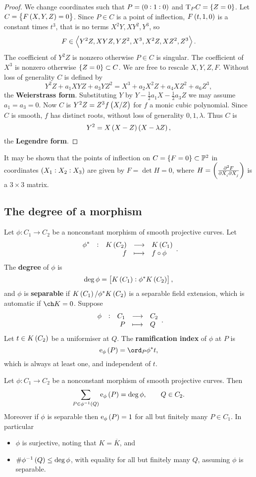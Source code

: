\begin{proof}
We change coordinates such that $ P = \br{0 : 1 : 0} $ and $ \T_PC = \cbr{Z = 0} $. Let $ C = \cbr{F\br{X, Y, Z} = 0} $. Since $ P \in C $ is a point of inflection, $ F\br{t, 1, 0} $ is a constant times $ t^3 $, that is no terms $ X^2Y, XY^2, Y^3 $, so
$$ F \in \left\langle Y^2Z, XYZ, YZ^2, X^3, X^2Z, XZ^2, Z^3 \right\rangle. $$
The coefficient of $ Y^2Z $ is nonzero otherwise $ P \in C $ is singular. The coefficient of $ X^3 $ is nonzero otherwise $ \cbr{Z = 0} \subset C $. We are free to rescale $ X, Y, Z, F $. Without loss of generality $ C $ is defined by
$$ Y^2Z + a_1XYZ + a_3YZ^2 = X^3 + a_2X^2Z + a_4XZ^2 + a_6Z^3, $$
the \textbf{Weierstrass form}. Substituting $ Y $ by $ Y - \tfrac{1}{2}a_1X - \tfrac{1}{2}a_3Z $ we may assume $ a_1 = a_3 = 0 $. Now $ C $ is $ Y^2Z = Z^3f\br{X / Z} $ for $ f $ a monic cubic polynomial. Since $ C $ is smooth, $ f $ has distinct roots, without loss of generality $ 0, 1, \lambda $. Thus $ C $ is
$$ Y^2 = X\br{X - Z}\br{X - \lambda Z}, $$
the \textbf{Legendre form}.
\end{proof}

\begin{remark*}
It may be shown that the points of inflection on $ C = \cbr{F = 0} \subset \PP^2 $ in coordinates $ \br{X_1 : X_2 : X_3} $ are given by $ F = \det H = 0 $, where $ H = \br{\tmd{F}{2}{X_i}{}{X_j}{}} $ is a $ 3 \times 3 $ matrix.
\end{remark*}

\subsection{The degree of a morphism}

\begin{definition*}
Let $ \phi : C_1 \to C_2 $ be a nonconstant morphism of smooth projective curves. Let
$$ \function[\phi^*]{K\br{C_2}}{K\br{C_1}}{f}{f \circ \phi}. $$
The \textbf{degree} of $ \phi $ is
$$ \deg \phi = \sbr{K\br{C_1} : \phi^*K\br{C_2}}, $$
and $ \phi $ is \textbf{separable} if $ K\br{C_1} / \phi^*K\br{C_2} $ is a separable field extension, which is automatic if $ \ch K = 0 $. Suppose
$$ \function[\phi]{C_1}{C_2}{P}{Q}. $$
Let $ t \in K\br{C_2} $ be a uniformiser at $ Q $. The \textbf{ramification index} of $ \phi $ at $ P $ is
$$ \e_\phi\br{P} = \ord_P \phi^*t, $$
which is always at least one, and independent of $ t $.
\end{definition*}

\begin{theorem}
\label{thm:2.8}
Let $ \phi : C_1 \to C_2 $ be a nonconstant morphism of smooth projective curves. Then
$$ \sum_{P \in \phi^{-1}\br{Q}} \e_\phi\br{P} = \deg \phi, \qquad Q \in C_2. $$
Moreover if $ \phi $ is separable then $ \e_\phi\br{P} = 1 $ for all but finitely many $ P \in C_1 $. In particular
\begin{itemize}
\item $ \phi $ is surjective, noting that $ K = \overline{K} $, and
\item $ \#\phi^{-1}\br{Q} \le \deg \phi $, with equality for all but finitely many $ Q $, assuming $ \phi $ is separable.
\end{itemize}
\end{theorem}

